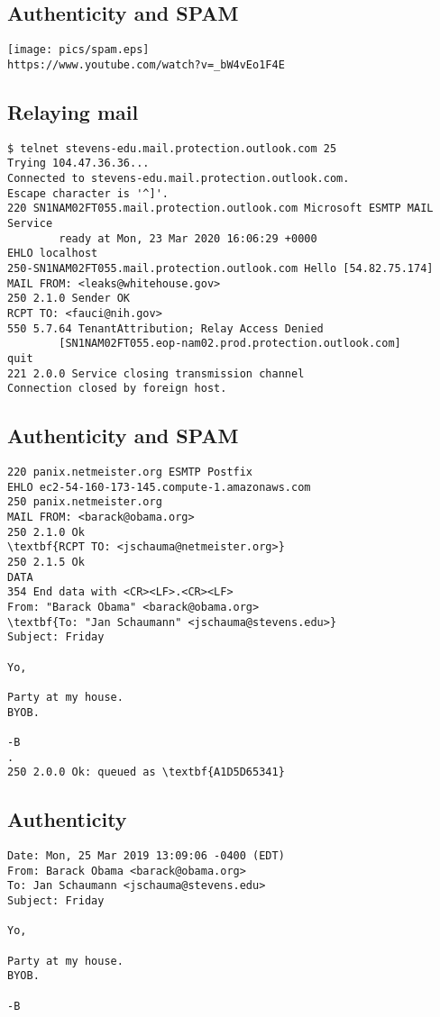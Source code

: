 \documentclass[xga]{xdvislides}
\begin{document}
\subsection{Authenticity and SPAM}
\vspace*{\fill}
\begin{center}
	\texttt{[image: pics/spam.eps]} \\
	\verb+https://www.youtube.com/watch?v=_bW4vEo1F4E+
\end{center}
\vspace*{\fill}

\subsection{Relaying mail}
\begin{verbatim}
$ telnet stevens-edu.mail.protection.outlook.com 25
Trying 104.47.36.36...
Connected to stevens-edu.mail.protection.outlook.com.
Escape character is '^]'.
220 SN1NAM02FT055.mail.protection.outlook.com Microsoft ESMTP MAIL Service
        ready at Mon, 23 Mar 2020 16:06:29 +0000
EHLO localhost
250-SN1NAM02FT055.mail.protection.outlook.com Hello [54.82.75.174]
MAIL FROM: <leaks@whitehouse.gov>
250 2.1.0 Sender OK
RCPT TO: <fauci@nih.gov>
550 5.7.64 TenantAttribution; Relay Access Denied
        [SN1NAM02FT055.eop-nam02.prod.protection.outlook.com]
quit
221 2.0.0 Service closing transmission channel
Connection closed by foreign host.
\end{verbatim}

\subsection{Authenticity and SPAM}
\smallish
\begin{Verbatim}
220 panix.netmeister.org ESMTP Postfix
EHLO ec2-54-160-173-145.compute-1.amazonaws.com
250 panix.netmeister.org
MAIL FROM: <barack@obama.org>
250 2.1.0 Ok
\textbf{RCPT TO: <jschauma@netmeister.org>}
250 2.1.5 Ok
DATA
354 End data with <CR><LF>.<CR><LF>
From: "Barack Obama" <barack@obama.org>
\textbf{To: "Jan Schaumann" <jschauma@stevens.edu>}
Subject: Friday

Yo,

Party at my house.
BYOB.

-B
.
250 2.0.0 Ok: queued as \textbf{A1D5D65341}
\end{Verbatim}
\Normalsize

\subsection{Authenticity}
\begin{verbatim}
Date: Mon, 25 Mar 2019 13:09:06 -0400 (EDT)                                                         
From: Barack Obama <barack@obama.org>
To: Jan Schaumann <jschauma@stevens.edu>
Subject: Friday

Yo,

Party at my house.
BYOB.

-B
\end{verbatim}
\end{document}
